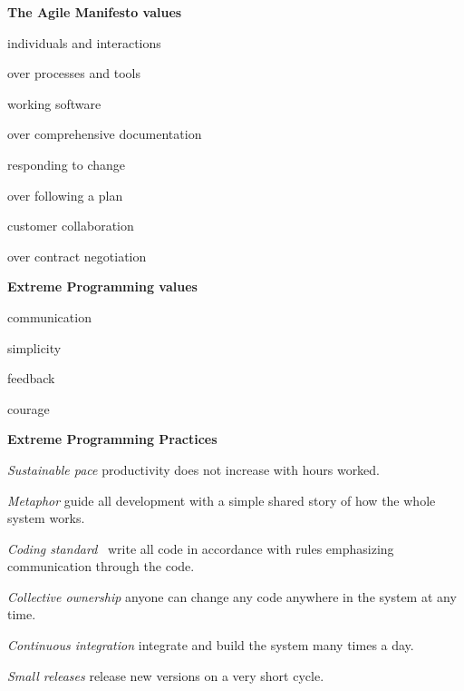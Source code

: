 \documentclass[landscape]{slides}
\renewcommand{\title}[1]{{\large\bfseries #1}}
\newenvironment{itemiz}%
  {\begin{list}{}{\raggedright
      \setlength{\itemsep}{2pt}%
      \setlength{\parskip}{4pt}\setlength{\parsep}{2pt}}}%
  {\end{list}}%
\begin{document}
 \begin{slide}
  \title{The Agile Manifesto \normalfont\normalsize values}
  \setlength{\topsep}{0pt}\setlength{\parskip}{5pt}
   \begin{itemiz}
   \item \normalsize individuals and interactions
   \item \small over processes and tools
   \item \normalsize working software
   \item \small over comprehensive documentation
   \item \normalsize responding to change
   \item \small over following a plan
   \item \normalsize customer collaboration
   \item \small over contract negotiation
  \end{itemiz}
   \normalsize 
 \end{slide}
 
 \begin{slide}
  \title{Extreme Programming \normalfont\normalsize values}
  \setlength{\topsep}{0pt}\setlength{\parskip}{5pt}
  \begin{itemiz}
   \item communication
   \item simplicity
   \item feedback
   \item courage
  \end{itemiz}
 \end{slide}
 
 \begin{slide}
  \title{Extreme Programming Practices}
  \begin{itemiz}
    \item[\textit{Sustainable pace}]
      {\small productivity does not increase with hours worked.}
    \item[\textit{Metaphor}]
      {\small guide all development with a simple shared story of how
      the whole system works.}
    \item[\textit{Coding standard}]
      {\small\ write all code in accordance with rules emphasizing
      communication through the code.}
    \item[\textit{Collective ownership}]
      {\small anyone can change any code anywhere in the system at any time.}
    \item[\textit{Continuous integration}]
      {\small integrate and build the system many times a day.}
    \item[\textcolor{mediumGray}{\textit{Small releases}}]
      {\small release new versions on a very short cycle.}
   \end{itemiz}
 \end{slide}
  
\end{document}
